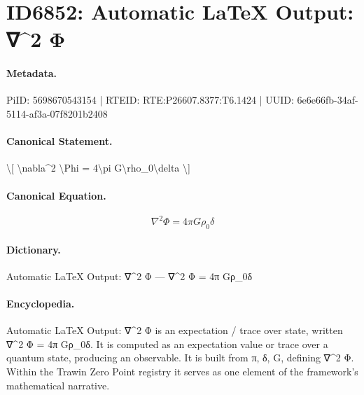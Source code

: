\section*{ID6852: Automatic LaTeX Output: ∇\textasciicircum{}2 Φ}
\paragraph{Metadata.}
PiID: 5698670543154 | RTEID: RTE:P26607.8377:T6.1424 | UUID: 6e6e66fb-34af-5114-af3a-07f8201b2408

\paragraph{Canonical Statement.}
\textbackslash{}[ \textbackslash{}nabla\textasciicircum{}2 \textbackslash{}Phi = 4\textbackslash{}pi G\textbackslash{}rho\_0\textbackslash{}delta \textbackslash{}]

\paragraph{Canonical Equation.}
\[
\nabla^2 \Phi = 4\pi G\rho_0\delta
\]

\paragraph{Dictionary.}
Automatic LaTeX Output: ∇\textasciicircum{}2 Φ — ∇\textasciicircum{}2 Φ = 4π Gρ\_0δ

\paragraph{Encyclopedia.}
Automatic LaTeX Output: ∇\textasciicircum{}2 Φ is an expectation / trace over state, written ∇\textasciicircum{}2 Φ = 4π Gρ\_0δ. It is computed as an expectation value or trace over a quantum state, producing an observable. It is built from π, δ, G, defining ∇\textasciicircum{}2 Φ. Within the Trawin Zero Point registry it serves as one element of the framework's mathematical narrative.

